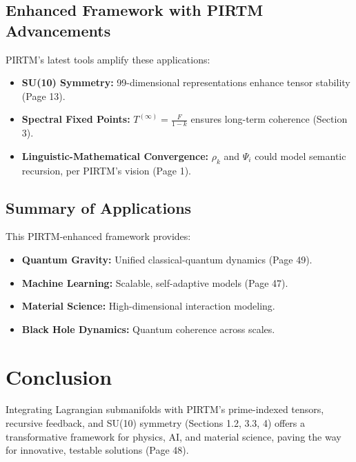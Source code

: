 \documentclass{article}
\theoremstyle{plain}
\begin{document}
\subsection{Enhanced Framework with PIRTM Advancements}
PIRTM’s latest tools amplify these applications:
\begin{itemize}
    \item \textbf{SU(10) Symmetry:} 99-dimensional representations enhance tensor stability (Page 13).
    \item \textbf{Spectral Fixed Points:} \( T^{(\infty)} = \frac{F}{1 - k} \) ensures long-term coherence (Section 3).
    \item \textbf{Linguistic-Mathematical Convergence:} \( \rho_k \) and \( \Psi_i \) could model semantic recursion, per PIRTM’s vision (Page 1).
\end{itemize}

\subsection*{Summary of Applications}
This PIRTM-enhanced framework provides:
\begin{itemize}
    \item \textbf{Quantum Gravity:} Unified classical-quantum dynamics (Page 49).
    \item \textbf{Machine Learning:} Scalable, self-adaptive models (Page 47).
    \item \textbf{Material Science:} High-dimensional interaction modeling.
    \item \textbf{Black Hole Dynamics:} Quantum coherence across scales.
\end{itemize}

\section{Conclusion}
Integrating Lagrangian submanifolds with PIRTM’s prime-indexed tensors, recursive feedback, and SU(10) symmetry (Sections 1.2, 3.3, 4) offers a transformative framework for physics, AI, and material science, paving the way for innovative, testable solutions (Page 48).
\nocite{*}


\end{document}
